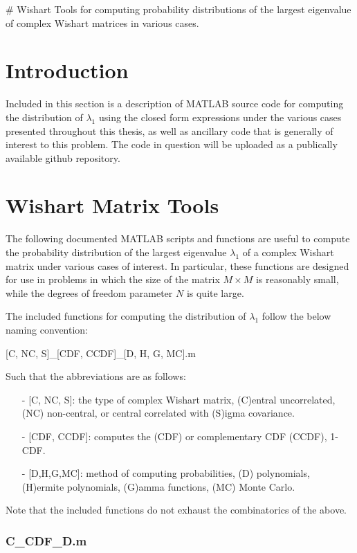 # Wishart
Tools for computing probability distributions of the largest eigenvalue of complex Wishart matrices in various cases.



\section{Introduction}
Included in this section is a description of MATLAB source code for computing the distribution of $\lambda_1$ using the closed form expressions under the various cases presented throughout this thesis, as well as ancillary code that is generally of interest to this problem. The code in question will be uploaded as a publically available github repository.

\section{Wishart Matrix Tools}
The following documented MATLAB scripts and functions are useful to compute the probability distribution of the largest eigenvalue $\lambda_1$ of a complex Wishart matrix under various cases of interest. In particular, these functions are designed for use in problems in which the size of the matrix $M\times M$ is reasonably small, while the degrees of freedom parameter $N$ is quite large. 

The included functions for computing the distribution of $\lambda_1$ follow the below naming convention:

[C, NC, S]\_[CDF, CCDF]\_[D, H, G, MC].m

\noindent Such that the abbreviations are as follows:
\begin{itemize}
\item[-] [C, NC, S]: the type of complex Wishart matrix, (C)entral uncorrelated, (NC) non-central, or central correlated with (S)igma covariance. 
\item[-] [CDF, CCDF]: computes the (CDF) or complementary CDF (CCDF), 1-CDF. 
\item[-] [D,H,G,MC]: method of computing probabilities, (D) polynomials, (H)ermite polynomials, (G)amma functions, (MC) Monte Carlo. 
\end{itemize}
Note that the included functions do not exhaust the combinatorics of the above.

\subsubsection*{C\_CDF\_D.m}

